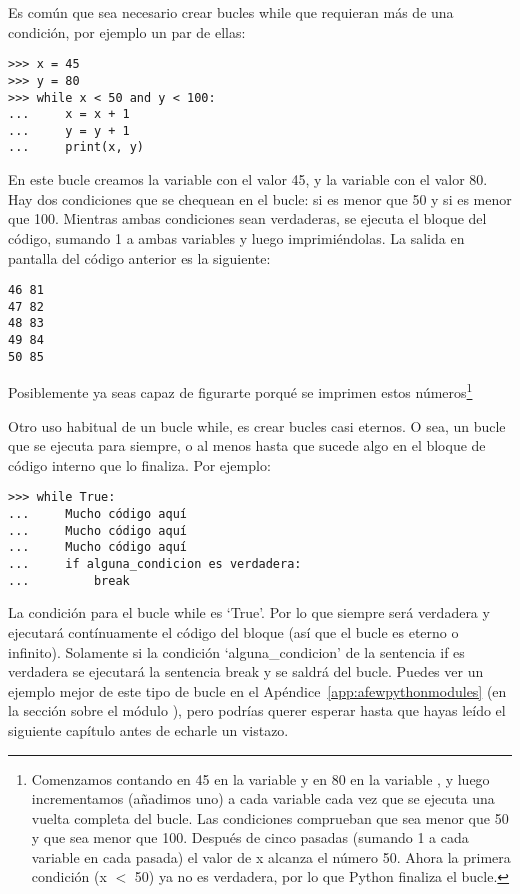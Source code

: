 Es común que sea necesario crear bucles while que requieran más de una condición, por ejemplo un par de ellas:

\begin{listing}
\begin{verbatim}
>>> x = 45
>>> y = 80
>>> while x < 50 and y < 100:
...     x = x + 1
...     y = y + 1
...     print(x, y)
\end{verbatim}
\end{listing}

En este bucle creamos la variable  con el valor 45, y la variable  con el valor 80.  Hay dos condiciones que se chequean en el bucle: si  es menor que 50 y si  es menor que 100. Mientras ambas condiciones sean verdaderas, se ejecuta el bloque del código, sumando 1 a ambas variables y luego imprimiéndolas.  La salida en pantalla del código anterior es la siguiente:

\begin{listing}
\begin{verbatim}
46 81
47 82
48 83
49 84
50 85
\end{verbatim}
\end{listing}

Posiblemente ya seas capaz de figurarte porqué se imprimen estos números\footnote{Comenzamos contando en 45 en la variable  y en 80 en la variable , y luego incrementamos (añadimos uno) a cada variable cada vez que se ejecuta una vuelta completa del bucle.  Las condiciones comprueban que  sea menor que 50 y que  sea menor que 100.  Después de cinco pasadas (sumando 1 a cada variable en cada pasada) el valor de x alcanza el número 50.  Ahora la primera condición (x $<$ 50) ya no es verdadera, por lo que Python finaliza el bucle.}

Otro uso habitual de un bucle while, es crear bucles casi eternos. O sea, un bucle que se ejecuta para siempre, o al menos hasta que sucede algo en el bloque de código interno que lo finaliza. Por ejemplo:

\begin{listingignore}
\begin{verbatim}
>>> while True:
...     Mucho código aquí
...     Mucho código aquí
...     Mucho código aquí
...     if alguna_condicion es verdadera:
...         break
\end{verbatim}
\end{listingignore}

La condición para el bucle while es `True'.  Por lo que siempre será verdadera y ejecutará contínuamente el código del bloque (así que el bucle es eterno o infinito). Solamente si la condición `alguna\_condicion' de la sentencia if es verdadera se ejecutará la sentencia break y se saldrá del bucle. Puedes ver un ejemplo mejor de este tipo de bucle en el Apéndice~\ref{app:afewpythonmodules} (en la sección sobre el módulo ), pero podrías querer esperar hasta que hayas leído el siguiente capítulo antes de echarle un vistazo.

